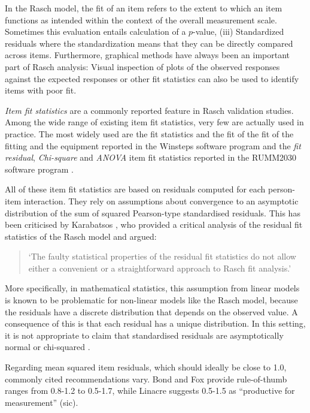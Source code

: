 \documentclass[11pt,a4paper]{article}
\begin{document}
In the Rasch model, the fit of an item refers to the extent to which an item functions as intended within the context of the overall measurement scale. Sometimes this evaluation entails calculation of a $p$-value, (iii) Standardized residuals where the standardization means that they can be directly compared across items. Furthermore, graphical methods have always been an important part of Rasch analysis: Visual inspection of plots of the observed responses against the expected responses or other fit statistics can also be used to identify items with poor fit.

\emph{Item fit statistics} are a commonly reported feature in Rasch validation studies. Among the wide range of existing item fit statistics, very few are actually used in practice. The most widely used are the fit statistics and the fit of the fit of the fitting and the equipment \cite{wright-Stone-1979,Wright-Masters-1982} reported in the Winsteps software program \cite{Winsteps} and the \emph{fit residual}, \emph{Chi-square} and \emph{ANOVA} item fit statistics reported in the RUMM2030 software program \cite{Andrich-Sheridan-Luo-2010}. 

All of these item fit statistics are based on residuals computed for each person-item interaction. They rely on assumptions about convergence to an asymptotic distribution of the sum of squared Pearson-type standardised residuals. This has been criticised by Karabatsos \cite{Karabatsos-2000}, who provided a critical analysis of the residual fit statistics of the Rasch model and argued:

\begin{quote}
`The faulty statistical properties of the residual fit statistics do not allow either a convenient or a straightforward approach to Rasch fit analysis.'
\end{quote}

More specifically, in mathematical statistics, this assumption from linear models is known to be problematic for non-linear models like the Rasch model, because the residuals have a discrete distribution that depends on the observed value. A consequence of this is that each residual has a unique distribution. In this setting, it is not appropriate to claim that standardised residuals are asymptotically normal or chi-squared \cite{Jennings-1986}. 

Regarding mean squared item residuals, which should ideally be close to 1.0, commonly cited recommendations vary. Bond and Fox \citeyear{Bond-Fox2015} provide rule-of-thumb ranges from 0.8-1.2 to 0.5-1.7, while Linacre \citeyear{Linacre2002} suggests 0.5-1.5 as “productive for measurement” (sic). 
\end{document}
